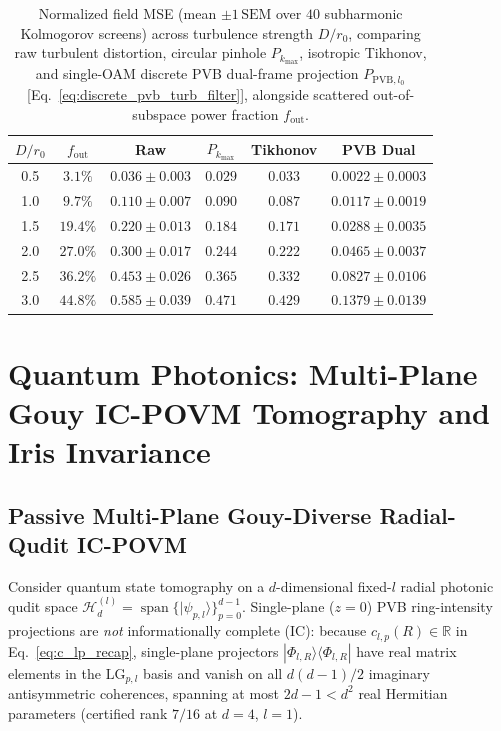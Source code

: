 \documentclass[aps,pra,onecolumn,notitlepage,11pt,tightenlines,nofootinbib,floatfix,longbibliography]{revtex4-2}
\newcommand{\ket}[1]{| #1 \rangle}
\newcommand{\bra}[1]{\langle #1 |}
\begin{document}
\begin{table}[t]
\caption{Normalized field MSE (mean $\pm 1\,\mathrm{SEM}$ over $40$ subharmonic Kolmogorov screens) across turbulence strength $D/r_0$, comparing raw turbulent distortion, circular pinhole $P_{k_{\max}}$, isotropic Tikhonov, and single-OAM discrete PVB dual-frame projection $P_{\mathrm{PVB},l_0}$ [Eq.~\eqref{eq:discrete_pvb_turb_filter}], alongside scattered out-of-subspace power fraction $f_{\mathrm{out}}$.}
\label{tab:kolmogorov}
\begin{ruledtabular}
\footnotesize
\setlength{\tabcolsep}{1.8pt}
\begin{tabular}{cccccc}
$D/r_0$ & $f_{\mathrm{out}}$ & Raw & $P_{k_{\max}}$ & Tikhonov & PVB Dual \\
\hline
0.5 & $3.1\%$ & $0.036\pm 0.003$ & $0.029$ & $0.033$ & $0.0022\pm 0.0003$ \\
1.0 & $9.7\%$ & $0.110\pm 0.007$ & $0.090$ & $0.087$ & $0.0117\pm 0.0019$ \\
1.5 & $19.4\%$ & $0.220\pm 0.013$ & $0.184$ & $0.171$ & $0.0288\pm 0.0035$ \\
2.0 & $27.0\%$ & $0.300\pm 0.017$ & $0.244$ & $0.222$ & $0.0465\pm 0.0037$ \\
2.5 & $36.2\%$ & $0.453\pm 0.026$ & $0.365$ & $0.332$ & $0.0827\pm 0.0106$ \\
3.0 & $44.8\%$ & $0.585\pm 0.039$ & $0.471$ & $0.429$ & $0.1379\pm 0.0139$ \\
\end{tabular}
\end{ruledtabular}
\end{table}

\section{Quantum Photonics: Multi-Plane Gouy IC-POVM Tomography and Iris Invariance}
\label{sec:quantum}

\subsection{Passive Multi-Plane Gouy-Diverse Radial-Qudit IC-POVM}
\label{subsec:povm}

Consider quantum state tomography on a $d$-dimensional fixed-$l$ radial photonic qudit space $\mathcal{H}_d^{(l)} = \operatorname{span}\{\ket{\psi_{p,l}}\}_{p=0}^{d-1}$. Single-plane ($z = 0$) PVB ring-intensity projections are \emph{not} informationally complete (IC): because $c_{l,p}(R) \in \mathbb{R}$ in Eq.~\eqref{eq:c_lp_recap}, single-plane projectors $\ket{\Phi_{l,R}}\bra{\Phi_{l,R}}$ have real matrix elements in the $\mathrm{LG}_{p,l}$ basis and vanish on all $d(d-1)/2$ imaginary antisymmetric coherences, spanning at most $2d - 1 < d^2$ real Hermitian parameters (certified rank $7/16$ at $d = 4$, $l = 1$).
\end{document}
